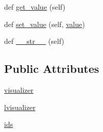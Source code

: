 \begin{DoxyCompactItemize}
\item 
def \mbox{\hyperlink{class_bridges_1_1_element_1_1_element_a283e6a2d0715eea745ed4cdcc8fc2ea6}{get\+\_\+value}} (self)
\item 
def \mbox{\hyperlink{class_bridges_1_1_element_1_1_element_a25bd0c22aed9063505cca514ecd0943d}{set\+\_\+value}} (self, \mbox{\hyperlink{class_bridges_1_1_element_1_1_element_adfe068cd72057bd5a45f71fdee2a6a91}{value}})
\item 
def \mbox{\hyperlink{class_bridges_1_1_element_1_1_element_a674e4f757d4874b462ce1536328ddf38}{\+\_\+\+\_\+str\+\_\+\+\_\+}} (self)
\end{DoxyCompactItemize}
\subsection*{Public Attributes}
\begin{DoxyCompactItemize}
\item 
\mbox{\hyperlink{class_bridges_1_1_element_1_1_element_a754c5ca67518e3c9ff6b6e7882ed05c6}{visualizer}}
\item 
\mbox{\hyperlink{class_bridges_1_1_element_1_1_element_a791eaed2d080d5f97e5bf95fd6c4d56a}{lvisualizer}}
\item 
\mbox{\hyperlink{class_bridges_1_1_element_1_1_element_a09bac6cdc3b9a08f42fde8dbe9ab7b98}{ids}}
\end{DoxyCompactItemize}
